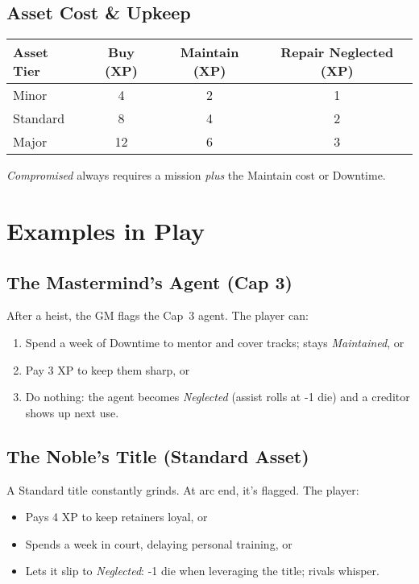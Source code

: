 \documentclass[12pt]{book}
\begin{document}
\subsection*{Asset Cost \& Upkeep}
\begin{center}
\begin{tabular}{lccc}
\toprule
\textbf{Asset Tier} & \textbf{Buy (XP)} & \textbf{Maintain (XP)} & \textbf{Repair Neglected (XP)} \\
\midrule
Minor & 4 & 2 & 1 \\
Standard & 8 & 4 & 2 \\
Major & 12 & 6 & 3 \\
\bottomrule
\end{tabular}
\end{center}
\noindent
\emph{Compromised} always requires a mission \emph{plus} the Maintain cost or Downtime.

\section{Examples in Play}

\subsection*{The Mastermind’s Agent (Cap 3)}
After a heist, the GM flags the Cap~3 agent. The player can:
\begin{enumerate}
  \item Spend a week of Downtime to mentor and cover tracks; stays \emph{Maintained}, or
  \item Pay 3 XP to keep them sharp, or
  \item Do nothing: the agent becomes \emph{Neglected} (assist rolls at -1 die) and a creditor shows up next use.
\end{enumerate}

\subsection*{The Noble’s Title (Standard Asset)}
A Standard title constantly grinds. At arc end, it’s flagged. The player:
\begin{itemize}
  \item Pays 4 XP to keep retainers loyal, or
  \item Spends a week in court, delaying personal training, or
  \item Lets it slip to \emph{Neglected}: -1 die when leveraging the title; rivals whisper.
\end{itemize}
\end{document}
